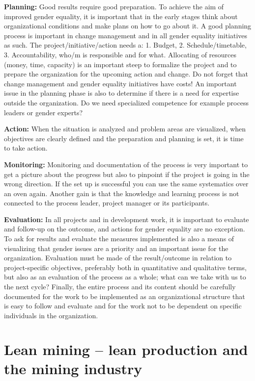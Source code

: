\documentclass[
  12pt,
]{scrbook}
\begin{document}
\textbf{Planning:} Good results require good preparation. To achieve the aim of improved gender equality, it is important that in the early stages think about organizational conditions and make plans on how to go about it. A good planning process is important in change management and in all gender equality initiatives as such. The project/initiative/action needs a: 1. Budget, 2. Schedule/timetable, 3. Accountability, who/m is responsible and for what. Allocating of resources (money, time, capacity) is an important steep to formalize the project and to prepare the organization for the upcoming action and change. Do not forget that change management and gender equality initiatives have costs! An important issue in the planning phase is also to determine if there is a need for expertise outside the organization. Do we need specialized competence for example process leaders or gender experts?

\textbf{Action:} When the situation is analyzed and problem areas are visualized, when objectives are clearly defined and the preparation and planning is set, it is time to take action.

\textbf{Monitoring:} Monitoring and documentation of the process is very important to get a picture about the progress but also to pinpoint if the project is going in the wrong direction. If the set up is successful you can use the same systematics over an oven again. Another gain is that the knowledge and learning process is not connected to the process leader, project manager or its participants.

\textbf{Evaluation:} In all projects and in development work, it is important to evaluate and follow-up on the outcome, and actions for gender equality are no exception. To ask for results and evaluate the measures implemented is also a means of visualizing that gender issues are a priority and an important issue for the organization. Evaluation must be made of the result/outcome in relation to project-specific objectives, preferably both in quantitative and qualitative terms, but also as an evaluation of the process as a whole; what can we take with us to the next cycle? Finally, the entire process and its content should be carefully documented for the work to be implemented as an organizational structure that is easy to follow and evaluate and for the work not to be dependent on specific individuals in the organization.

\hypertarget{lean-mining-lean-production-and-the-mining-industry}{%
\chapter{Lean mining -- lean production and the mining industry}\label{lean-mining-lean-production-and-the-mining-industry}}
\end{document}

